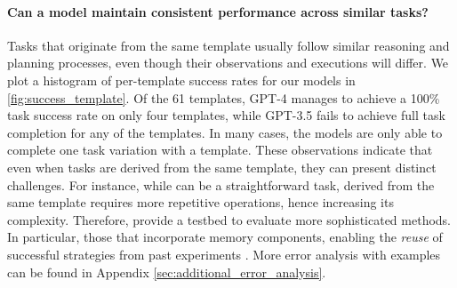 \paragraph{Can a model maintain consistent performance across similar tasks?} Tasks that originate from the same template usually follow similar reasoning and planning processes, even though their observations and executions will differ.
We plot a histogram of per-template success rates for our models in \autoref{fig:success_template}. 
Of the 61 templates, \textsc{GPT-4} manages to achieve a 100\% task success rate on only four templates, while \textsc{GPT-3.5} fails to achieve full task completion for any of the templates. In many cases, the models are only able to complete one task variation with a template.  
These observations indicate that even when tasks are derived from the same template, they can present distinct challenges. 
For instance, while  can be a straightforward task,  derived from the same template requires more repetitive operations, hence increasing its complexity.
Therefore, \ours provide a testbed to evaluate more sophisticated methods. In particular, those that incorporate memory components, enabling the \emph{reuse} of successful strategies from past experiments \cite{zhou2021hierarchical, wang2023voyager}.
More error analysis with examples can be found in Appendix \ref{sec:additional_error_analysis}.

